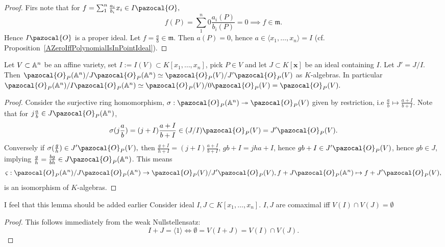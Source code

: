 \begin{proof}
    Firs note that for $f = \sum_1^n \frac{a_i}{b_i}x_i\in I\pazocal{O},$
    $$f(P)=\sum_1^n 0\frac{a_i(P)}{b_i(P)}=0 \implies f \in \mathfrak{m}.$$
    Hence $I\pazocal{O}$ is a proper ideal. Let $f=\frac{a}{b}\in \mathfrak{m}$. Then $a(P)=0$, hence $a\in \langle x_1,\dots,x_n\rangle = I$ (cf. Proposition~\ref{AZeroIffPolynomialIsInPointIdeal}).  
\end{proof}
\begin{proposition}\label{IsomorphimOfLocalRingsOfRationalFunctions}
    Let $V\subset \mathbb{A}^n$ be an affine variety, set $I:= I(V)\subset K[x_1,\dots,x_n]$, pick $P\in V$ and let $J\subset K[\mathbf{x}]$ be an ideal containing $I$. Let $J' = J/I$. Then $\pazocal{O}_P(\A^n)/J\pazocal{O}_P(\A^n)\simeq \pazocal{O}_P(V)/J'\pazocal{O}_P(V)$ as $K$-algebras. In particular $\pazocal{O}_P(\A^n)/I\pazocal{O}_P(\A^n) \simeq \pazocal{O}_P(V)/0\pazocal{O}_P(V)=\pazocal{O}_P(V).$  
\end{proposition}
\begin{proof}
    Consider the surjective ring homomorphism, $\sigma : \pazocal{O}_P(\A^n) \twoheadrightarrow \pazocal{O}_P(V)$
    given by restriction, i.e $\frac{a}{b}\mapsto \frac{a+I}{b+I}$. Note that for $j\frac{a}{b}\in J\pazocal{O}_P(\A^n)$, 
    $$\sigma(j\frac{a}{b})=(j+I)\frac{a+I}{b+I}\in (J/I) \pazocal{O}_P(V) = J'\pazocal{O}_P(V).$$
    Conversely if $\sigma(\frac{g}{h}) \in J'\pazocal{O}_P(V),$ then $\frac{g+I}{h+I} = (j+I)\frac{a+I}{b+I}$, $gb + I = jha + I$, hence $gb + I \in J' \pazocal{O}_P(V)$, hence $gb \in J$, implying $\frac{g}{h}=\frac{bg}{bh}\in J\pazocal{O}_P(\A^n)$. This means 
    \begin{gather*}
        \varsigma : \pazocal{O}_P(\A^n)/J\pazocal{O}_P(\A^n)\rightarrow  \pazocal{O}_P(V)/J'\pazocal{O}_P(V), f + J\pazocal{O}_P(\A^n) \mapsto f+ J'\pazocal{O}_P(V),
    \end{gather*}
    is an isomorphism of $K$-algebras. 
\end{proof}
\begin{lemma}\label{ComaximalNullstellensatz}{\LARGE I feel that this lemma should be added earlier}
    Consider ideal $I,J\subset K[x_1,\dots,x_n]$. $I,J$ are comaximal iff $V(I)\cap V(J) = \emptyset$
\end{lemma}
\begin{proof}
    This follows immediately from the weak Nullstellensatz: 
    $$I+J = \langle 1\rangle \iff \emptyset =V(I+J) = V(I)\cap V(J).$$
\end{proof}

